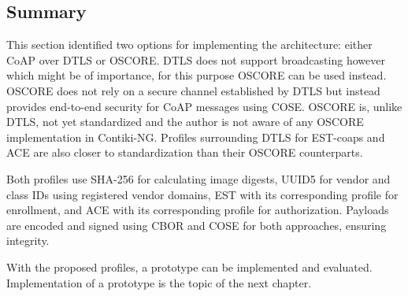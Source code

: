 \documentclass[0-thesis.tex]{subfiles}
\begin{document}
\subsection{Summary}
\label{ssec:profiles-summary}
This section identified two options for implementing the architecture: either CoAP over
DTLS or OSCORE. DTLS does not support broadcasting however which might be of importance,
for this purpose OSCORE can be used instead. OSCORE does not rely on a secure channel
established by DTLS but instead provides end-to-end security for CoAP messages using COSE.
OSCORE is, unlike DTLS, not yet standardized and the author is not aware of any OSCORE
implementation in Contiki-NG. Profiles surrounding DTLS for EST-coaps and ACE are also
closer to standardization than their OSCORE counterparts.

Both profiles use SHA-256 for calculating image digests, UUID5 for vendor and class IDs
using registered vendor domains, EST with its corresponding profile for enrollment, and
ACE with its corresponding profile for authorization. Payloads are encoded and signed
using CBOR and COSE for both approaches, ensuring integrity.

With the proposed profiles, a prototype can be implemented and evaluated. Implementation
of a prototype is the topic of the next chapter.
\end{document}
